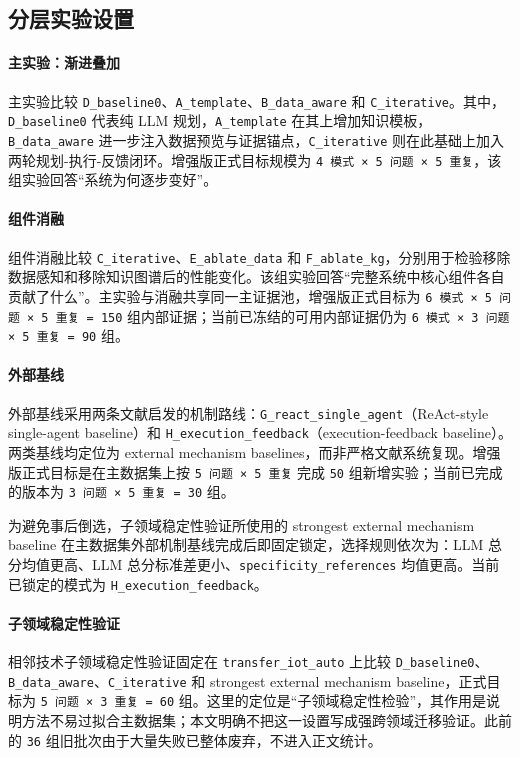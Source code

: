 \subsection{分层实验设置}

\paragraph{主实验：渐进叠加}
主实验比较 \texttt{D\_baseline0}、\texttt{A\_template}、\texttt{B\_data\_aware} 和 \texttt{C\_iterative}。其中，\texttt{D\_baseline0} 代表纯 LLM 规划，\texttt{A\_template} 在其上增加知识模板，\texttt{B\_data\_aware} 进一步注入数据预览与证据锚点，\texttt{C\_iterative} 则在此基础上加入两轮规划-执行-反馈闭环。增强版正式目标规模为 \texttt{4 模式 × 5 问题 × 5 重复}，该组实验回答“系统为何逐步变好”。

\paragraph{组件消融}
组件消融比较 \texttt{C\_iterative}、\texttt{E\_ablate\_data} 和 \texttt{F\_ablate\_kg}，分别用于检验移除数据感知和移除知识图谱后的性能变化。该组实验回答“完整系统中核心组件各自贡献了什么”。主实验与消融共享同一主证据池，增强版正式目标为 \texttt{6 模式 × 5 问题 × 5 重复 = 150} 组内部证据；当前已冻结的可用内部证据仍为 \texttt{6 模式 × 3 问题 × 5 重复 = 90} 组。

\paragraph{外部基线}
外部基线采用两条文献启发的机制路线：\texttt{G\_react\_single\_agent}（ReAct-style single-agent baseline）和 \texttt{H\_execution\_feedback}（execution-feedback baseline）。两类基线均定位为 external mechanism baselines，而非严格文献系统复现。增强版正式目标是在主数据集上按 \texttt{5 问题 × 5 重复} 完成 \texttt{50} 组新增实验；当前已完成的版本为 \texttt{3 问题 × 5 重复 = 30} 组。

为避免事后倒选，子领域稳定性验证所使用的 strongest external mechanism baseline 在主数据集外部机制基线完成后即固定锁定，选择规则依次为：LLM 总分均值更高、LLM 总分标准差更小、\texttt{specificity\_references} 均值更高。当前已锁定的模式为 \texttt{H\_execution\_feedback}。

\paragraph{子领域稳定性验证}
相邻技术子领域稳定性验证固定在 \texttt{transfer\_iot\_auto} 上比较 \texttt{D\_baseline0}、\texttt{B\_data\_aware}、\texttt{C\_iterative} 和 strongest external mechanism baseline，正式目标为 \texttt{5 问题 × 3 重复 = 60} 组。这里的定位是“子领域稳定性检验”，其作用是说明方法不易过拟合主数据集；本文明确不把这一设置写成强跨领域迁移验证。此前的 \texttt{36} 组旧批次由于大量失败已整体废弃，不进入正文统计。

